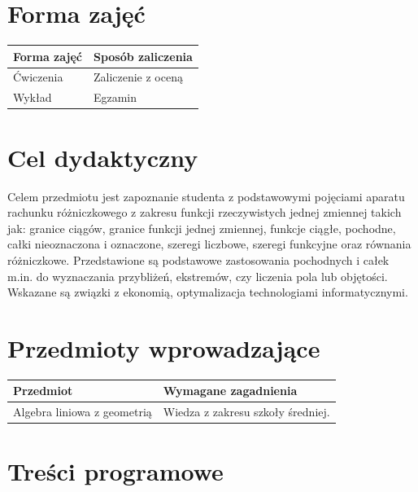 \documentclass[12pt, a4paper]{article}
\begin{document}
\section{Forma zajęć}

\begin{tabular}{ll}
  \hline
  \textbf{Forma zajęć} & \textbf{Sposób zaliczenia} \\
  \hline
  Ćwiczenia & Zaliczenie z oceną \\
  Wykład & Egzamin \\
  \hline
\end{tabular}

\section{Cel dydaktyczny}

Celem przedmiotu jest zapoznanie studenta z podstawowymi pojęciami aparatu rachunku różniczkowego z zakresu funkcji rzeczywistych jednej zmiennej takich jak: granice ciągów, granice funkcji jednej zmiennej, funkcje ciągłe, pochodne, całki nieoznaczona i oznaczone, szeregi liczbowe, szeregi funkcyjne oraz równania różniczkowe. Przedstawione są podstawowe zastosowania  pochodnych i całek m.in. do wyznaczania przybliżeń, ekstremów,  czy  liczenia pola lub objętości. Wskazane są związki z ekonomią, optymalizacja technologiami  informatycznymi.

\section{Przedmioty wprowadzające}

\begin{tabularx}{\textwidth}{lX}
  \hline
  \textbf{Przedmiot} & \textbf{Wymagane zagadnienia} \\
  \hline
  Algebra liniowa z geometrią & Wiedza z zakresu szkoły średniej. \\
  \hline
\end{tabularx}

\section{Treści programowe}
\end{document}
